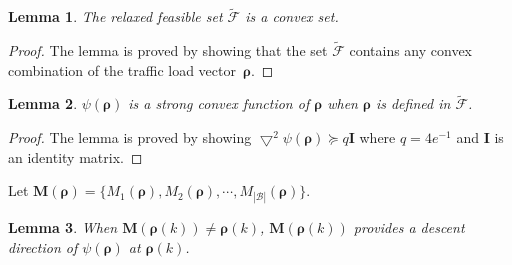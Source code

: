 \documentclass[journal]{IEEEtran}
\newtheorem{lemma}{Lemma}
\theoremstyle{definition}
\begin{document}
\begin{lemma}
\label{thm:feasible_set}
The relaxed feasible set $\mathcal{\tilde{F}}$ is a convex set.
\end{lemma}
\begin{proof}
The lemma is proved by showing that the set $\mathcal{\tilde{F}}$ contains any convex combination of the traffic load vector~$\boldsymbol{\rho}$.
\end{proof}
\begin{lemma}
\label{thm:convexity}
$\psi(\boldsymbol{\rho})$ is a strong convex function of $\boldsymbol{\rho}$ when $\boldsymbol{\rho}$ is defined in $\mathcal{\tilde{F}}$.
\end{lemma}
\begin{proof}
\label{prf:cvx}
The lemma is proved by showing $\bigtriangledown^{2}\psi(\boldsymbol{\rho})\succeq q\boldsymbol{I}$ where $q=4e^{-1}$ and $\boldsymbol{I}$ is an identity matrix.
\end{proof}
Let $\boldsymbol{M}(\boldsymbol{\rho})=\{M_{1}(\boldsymbol{\rho}),M_{2}(\boldsymbol{\rho}),\cdots,M_{|\mathcal{B}|}(\boldsymbol{\rho})\}$.
\begin{lemma}
\label{thm:descent_direction}
When $\boldsymbol{M}(\boldsymbol{\rho}(k)) \neq \boldsymbol{\rho}(k)$, $\boldsymbol{M}(\boldsymbol{\rho}(k))$ provides a descent direction of $\psi(\boldsymbol{\rho})$ at $\boldsymbol{\rho}(k)$.
\end{lemma}
\end{document}
